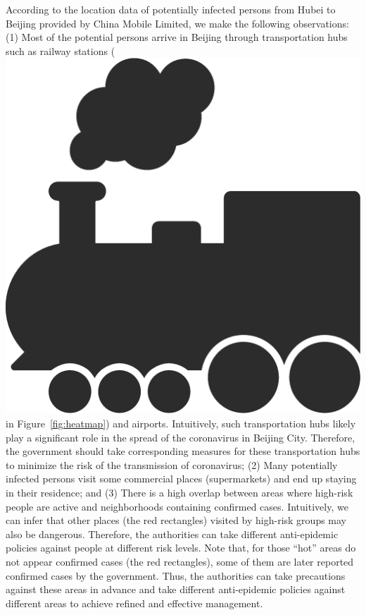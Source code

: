 According to the location data of potentially infected persons from Hubei to Beijing provided by China Mobile Limited, we make the following observations:
(1) Most of the potential persons arrive in Beijing through transportation hubs such as railway stations (\includegraphics[height=0.8\baselineskip]{figs/train.eps} in Figure~\ref{fig:heatmap}) and airports. Intuitively, such transportation hubs likely play a significant role in the spread of the coronavirus in Beijing City. Therefore, the government should take corresponding measures for these transportation hubs to minimize the risk of the transmission of coronavirus;
(2) Many potentially infected persons visit some commercial places (\eg supermarkets) and end up staying in their residence; and
(3) There is a high overlap between areas where high-risk people are active and neighborhoods containing confirmed cases. 
Intuitively, we can infer that other places (\eg the red rectangles) visited by high-risk groups may also be dangerous. 
Therefore, the authorities can take different anti-epidemic policies against people at different risk levels.
Note that, for those ``hot'' areas do not appear confirmed cases (\eg the red rectangles), some of them are later reported confirmed cases by the government.
%
Thus, the authorities can take precautions against these areas in advance and take different anti-epidemic policies against different areas to achieve refined and effective management.

